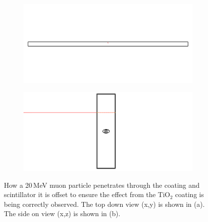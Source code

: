 \begin{figure}[!h]
\centering
\begin{subfigure}{.5\textwidth}
  \centering
  \includegraphics[width=\linewidth]{Chapter4/Figs/Raster/year1Plots/lengthOnViewBarMuon1530By720.png}
  \captionsetup{width=.9\linewidth}
  \caption{}
  \label{subFig:lengthOnViewBarMuon1530Square}
\end{subfigure}%
\begin{subfigure}{.5\textwidth}
  \centering
  \includegraphics[width=\linewidth]{Chapter4/Figs/Raster/sideOnViewBarMuon1530By720.png}
  \captionsetup{width=.9\linewidth}
  \caption{}
  \label{subFig:sideOnViewBarMuon8}
\end{subfigure}
\caption[A 20\,MeV muon particle penetrating a single bar.]{How a 20\,MeV muon particle penetrates through the coating and scintillator it is offset to ensure the effect from the TiO$_2$ coating is being correctly observed. The top down view (x,y) is shown in (a). The side on view (x,z) is shown in (b).}
\label{fig:lengthAndSideViewBarMuon}
\end{figure}


